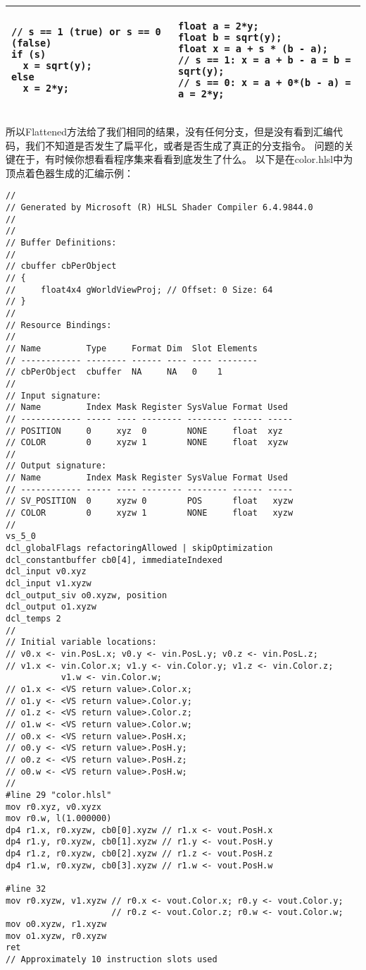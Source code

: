 \begin{flushleft}
\begin{tabular}{|p{20em}|p{20em}|}
\begin{lstlisting}
// s == 1 (true) or s == 0 (false)
if (s)
  x = sqrt(y);
else
  x = 2*y;
\end{lstlisting}
&
\begin{lstlisting}
float a = 2*y;
float b = sqrt(y);
float x = a + s * (b - a);
// s == 1: x = a + b - a = b = sqrt(y);
// s == 0: x = a + 0*(b - a) = a = 2*y;
\end{lstlisting}\\
\hline
\end{tabular}
所以Flattened方法给了我们相同的结果，没有任何分支，但是没有看到汇编代码，我们不知道是否发生了扁平化，或者是否生成了真正的分支指令。 问题的关键在于，有时候你想看看程序集来看看到底发生了什么。 以下是在color.hlsl中为顶点着色器生成的汇编示例：\\
\begin{lstlisting}
//
// Generated by Microsoft (R) HLSL Shader Compiler 6.4.9844.0
//
//
// Buffer Definitions:
//
// cbuffer cbPerObject
// {
//     float4x4 gWorldViewProj; // Offset: 0 Size: 64
// }
//
// Resource Bindings:
//
// Name         Type     Format Dim  Slot Elements
// ------------ -------- ------ ---- ---- --------
// cbPerObject  cbuffer  NA     NA   0    1
//
// Input signature:
// Name         Index Mask Register SysValue Format Used
// ------------ ----- ---- -------- -------- ------ -----
// POSITION     0     xyz  0        NONE     float  xyz
// COLOR        0     xyzw 1        NONE     float  xyzw
//
// Output signature:
// Name         Index Mask Register SysValue Format Used
// ------------ ----- ---- -------- -------- ------ -----
// SV_POSITION  0     xyzw 0        POS      float   xyzw
// COLOR        0     xyzw 1        NONE     float   xyzw
//
vs_5_0
dcl_globalFlags refactoringAllowed | skipOptimization
dcl_constantbuffer cb0[4], immediateIndexed
dcl_input v0.xyz
dcl_input v1.xyzw
dcl_output_siv o0.xyzw, position
dcl_output o1.xyzw
dcl_temps 2
//
// Initial variable locations:
// v0.x <- vin.PosL.x; v0.y <- vin.PosL.y; v0.z <- vin.PosL.z;
// v1.x <- vin.Color.x; v1.y <- vin.Color.y; v1.z <- vin.Color.z;
           v1.w <- vin.Color.w;
// o1.x <- <VS return value>.Color.x;
// o1.y <- <VS return value>.Color.y;
// o1.z <- <VS return value>.Color.z;
// o1.w <- <VS return value>.Color.w;
// o0.x <- <VS return value>.PosH.x;
// o0.y <- <VS return value>.PosH.y;
// o0.z <- <VS return value>.PosH.z;
// o0.w <- <VS return value>.PosH.w;
//
#line 29 "color.hlsl"
mov r0.xyz, v0.xyzx
mov r0.w, l(1.000000)
dp4 r1.x, r0.xyzw, cb0[0].xyzw // r1.x <- vout.PosH.x
dp4 r1.y, r0.xyzw, cb0[1].xyzw // r1.y <- vout.PosH.y
dp4 r1.z, r0.xyzw, cb0[2].xyzw // r1.z <- vout.PosH.z
dp4 r1.w, r0.xyzw, cb0[3].xyzw // r1.w <- vout.PosH.w

#line 32
mov r0.xyzw, v1.xyzw // r0.x <- vout.Color.x; r0.y <- vout.Color.y;
                     // r0.z <- vout.Color.z; r0.w <- vout.Color.w;
mov o0.xyzw, r1.xyzw
mov o1.xyzw, r0.xyzw
ret
// Approximately 10 instruction slots used
\end{lstlisting}
\end{flushleft}

